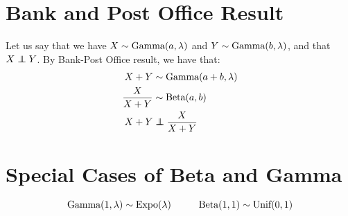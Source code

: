 \documentclass[11pt]{article}
\theoremstyle{definition}
\theoremstyle{remark}
\newcommand\independent{\protect\mathpalette{\protect\independenT}{\perp}}
\def\independenT#1#2{\mathrel{\rlap{$#1#2$}\mkern2mu{#1#2}}}
\newcommand{\Unif}{\textnormal{Unif}}
\newcommand{\Beta}{\textnormal{Beta}}
\newcommand{\Expo}{\textnormal{Expo}}
\newcommand{\Gam}{\textnormal{Gamma}}
\begin{document}
	
	
\section{Bank and Post Office Result}
Let us say that we have $X \sim \Gam(a, \lambda)$ and $Y \sim \Gam(b, \lambda)$, and that $X \independent Y$. By Bank-Post Office result, we have that:
\begin{align*}
	X + Y &\sim \Gam(a + b, \lambda)\\
	\frac{X}{X + Y} &\sim \Beta(a, b)\\
	X + Y &\independent \frac{X}{X + Y}
\end{align*}
\section{Special Cases of Beta and Gamma}
\[\Gam(1, \lambda) \sim \Expo(\lambda) \hspace{1 cm} \Beta(1, 1) \sim \Unif(0, 1)\]

\pagebreak
\end{document}
